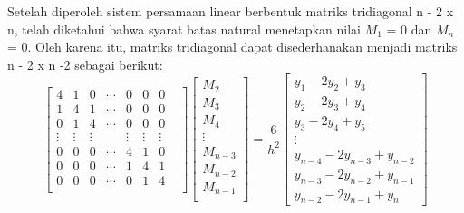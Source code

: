 \documentclass{article}
\begin{document}
Setelah diperoleh sistem persamaan linear berbentuk matriks tridiagonal n - 2 x n, telah diketahui bahwa syarat batas natural menetapkan nilai $M_1$ = 0 dan $M_n$ = 0. Oleh karena itu, matriks tridiagonal dapat disederhanakan menjadi matriks n - 2 x n -2 sebagai berikut:
\[
\begin{bmatrix}
    4 & 1 & 0 & \cdots & 0 & 0 & 0\\
    1 & 4 & 1 & \cdots & 0 & 0 & 0 \\
    0 & 1 & 4 & \cdots & 0 & 0 & 0 \\
    \vdots & \vdots & \vdots  & &  \vdots & \vdots & \vdots & \\
    0 & 0 & 0 & \cdots & 4 & 1 & 0 \\
    0 & 0 & 0 & \cdots & 1 & 4 & 1 \\
    0 & 0 & 0 & \cdots & 0 & 1 & 4 \\
\end{bmatrix}
\begin{bmatrix}
    M_2 \\ 
    M_3 \\
    M_4 \\
    \vdots \\
    M_{n-3} \\
    M_{n-2} \\
    M_{n-1} \\
\end{bmatrix} = \frac{6}{h^2} 
\begin{bmatrix}
    y_1 - 2y_2 + y_3 \\
    y_2 - 2y_3 + y_4 \\
    y_3 - 2y_4 + y_5 \\
    \vdots \\
    y_{n-4} - 2y_{n-3} + y_{n-2} \\
    y_{n-3} - 2y_{n-2} + y_{n-1} \\
    y_{n-2} - 2y_{n-1} + y_{n}
\end{bmatrix}
\]
\end{document}
